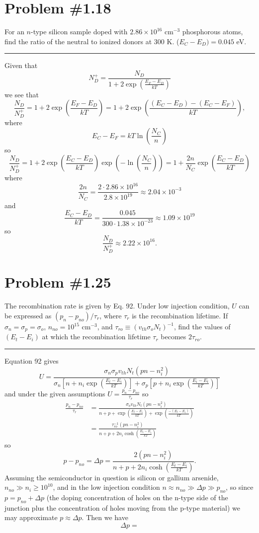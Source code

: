 \documentclass{article}
\newcommand{\horline}
           {\begin{center}
              \noindent\rule{8cm}{0.4pt}
            \end{center}}
\begin{document}
\section*{Problem \#1.18}
For an $n$-type silicon sample doped with $2.86 \times 10^{16}$ cm$^{-3}$
phosphorous atoms, find the ratio of the neutral to ionized donors at 300 K.
($E_C - E_D) = 0.045$ eV.
\horline
Given that
$$
N_D^+ = \frac{N_D}{1 + 2 \exp \left(\frac{E_F - E_D}{kT}\right)}
$$
we see that
$$
\frac{N_D}{N_D^+} = 1 + 2 \exp \left(\frac{E_F - E_D}{kT}\right) 
                  = 1 + 2 \exp \left(\frac{(E_C - E_D) - (E_C - E_F)}{kT}\right), 
$$
where
$$
E_C - E_F = kT \ln \left(\frac{N_C}{n}\right)
$$
so
$$
\frac{N_D}{N_D^+} = 1 + 2 \exp \left(\frac{E_C - E_D}{kT}\right) 
                          \exp \left(-\ln\left(\frac{N_C}{n}\right)\right)
                  = 1 + \frac{2 n}{N_C} \exp \left(\frac{E_C - E_D}{kT}\right)
$$
where
$$
\frac{2n}{N_C} = \frac{2 \cdot 2.86 \times 10^{16}}{2.8 \times 10^{19}} 
  \approx 2.04 \times 10^{-3}
$$
and
$$
\frac{E_C - E_D}{kT} = \frac{0.045}{300 \cdot 1.38 \times 10^{-23}} 
  \approx 1.09 \times 10^{19}
$$
so
$$
\frac{N_D}{N_D^+} \approx 2.22 \times 10^16.
$$

\section*{Problem \#1.25}
The recombination rate is given by Eq. 92. Under low injection condition, $U$
can be expressed as $(p_n - p_{no})/\tau_r$, where $\tau_r$ is the 
recombination lifetime. If $\sigma_n = \sigma_p = \sigma_o$, 
$n_{no} = 10^{15}$ cm$^{-3}$, and 
$\tau_{ro} \equiv (v_{th} \sigma_o N_t)^{-1}$, find the values of 
$(E_t - E_i)$ at which the recombination lifetime $\tau_r$ becomes
$2 \tau_{ro}$.
\horline

Equation 92 gives
$$
U = \frac{\sigma_n \sigma_p v_{th} N_t (pn - n_i^2)}
         {\sigma_n [n + n_i \exp \left(\frac{E_t - E_i}{kT}\right)]
        + \sigma_p [p + n_i \exp \left(\frac{E_i - E_t}{kT}\right)]}
$$
and under the given assumptions $U = \frac{p_n - p_{no}}{\tau_r}$ so
\begin{align*}
\frac{p_n - p_{no}}{\tau_r} 
  &= \frac{\sigma_o v_{th} N_t (pn - n_i^2)}
         {n + p + \exp\left(\frac{E_t - E_i}{kT}\right)
                + \exp\left(\frac{-(E_t - E_i)}{kT}\right)} \\
  &= \frac{\tau_{ro}^{-1} (pn - n_i^2)}
          {n + p + 2n_i \cosh \left(\frac{E_t - E_i}{kT}\right)}
\end{align*}
so
$$
p - p_{no} = \Delta p 
           = \frac{2 (pn - n_i^2)}
                  {n + p + 2n_i \cosh \left(\frac{E_t - E_i}{kT}\right)}.
$$
Assuming the semiconductor in question is silicon or gallium arsenide,
$n_{no} \gg n_i \geq 10^{10}$, and in the low injection condition 
$n \approx n_{no} \gg \Delta p \gg p_{no}$, so since 
$p = p_{no} + \Delta p$ (the doping concentration of holes on the n-type
side of the junction plus the concentration of holes moving from the
p-type material) we may approximate $p \approx \Delta p$. Then we have
$$
\Delta p = 
$$
\end{document}
